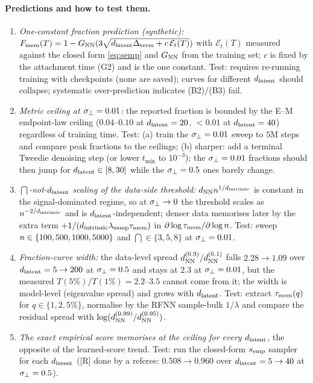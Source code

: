 \paragraph{Predictions and how to test them.}
\begin{enumerate}
\item \emph{One-constant fraction prediction (synthetic):} $F_{\rm mem}(T)=1-G_{\rm NN}(3\sqrt{d_{\mathrm{latent}}\Delta_{\rm term}+c\,\mathcal E_t(T)})$ with $\mathcal E_t(T)$ measured against the closed form \eqref{eq:semp} and $G_{\rm NN}$ from the training set; $c$ is fixed by the attachment time (G2) and is the one constant. Test: requires re-running training with checkpoints (none are saved); curves for different $d_{\mathrm{latent}}$ should collapse; systematic over-prediction indicates (B2)/(B3) fail.
\item \emph{Metric ceiling at $\sigma_{\perp}=0.01$:} the reported fraction is bounded by the E--M endpoint-law ceiling ($0.04$--$0.10$ at $d_{\mathrm{latent}}=20$, $<0.01$ at $d_{\mathrm{latent}}=40$) regardless of training time. Test: (a) train the $\sigma_{\perp}=0.01$ sweep to $5$M steps and compare peak fractions to the ceilings; (b) sharper: add a terminal Tweedie denoising step (or lower $t_{\min}$ to $10^{-3}$); the $\sigma_{\perp}=0.01$ fractions should then jump for $d_{\mathrm{latent}}\in[8,30]$ while the $\sigma_{\perp}=0.5$ ones barely change.
\item \emph{$\dint$-not-$d_{\mathrm{latent}}$ scaling of the data-side threshold:} $d_{\rm NN}n^{1/d_{\mathrm{intrinsic}}}$ is constant in the signal-dominated regime, so at $\sigma_{\perp}\to0$ the threshold scales as $n^{-2/d_{\mathrm{intrinsic}}}$ and is $d_{\mathrm{latent}}$-independent; denser data memorises later by the extra term $+1/(d_{\mathrm{intrinsic}}\lambda_{\rm samp}\tau_{\mathrm{mem}})$ in $\partial\log\tau_{\mathrm{mem}}/\partial\log n$. Test: sweep $n\in\{100,500,1000,5000\}$ and $\dint\in\{3,5,8\}$ at $\sigma_{\perp}=0.01$.
\item \emph{Fraction-curve width:} the data-level spread $d^{(0.9)}_{\rm NN}/d^{(0.1)}_{\rm NN}$ falls $2.28\to1.09$ over $d_{\mathrm{latent}}=5\to200$ at $\sigma_{\perp}=0.5$ and stays at $2.3$ at $\sigma_{\perp}=0.01$, but the measured $T(5\%)/T(1\%)=2.2$--$3.5$ cannot come from it; the width is model-level (eigenvalue spread) and grows with $d_{\mathrm{latent}}$. Test: extract $\tau_{\mathrm{mem}}(q)$ for $q\in\{1,2,5\%\}$, normalise by the RFNN sample-bulk $1/\lambda$ and compare the residual spread with $\log(d^{(0.99)}_{\rm NN}/d^{(0.95)}_{\rm NN})$.
\item \emph{The exact empirical score memorises at the ceiling for every $d_{\mathrm{latent}}$}, the opposite of the learned-score trend. Test: run the closed-form $s_{\rm emp}$ sampler for each $d_{\mathrm{latent}}$ ([R] done by a referee: $0.508\to0.960$ over $d_{\mathrm{latent}}=5\to40$ at $\sigma_{\perp}=0.5$).
\end{enumerate}

